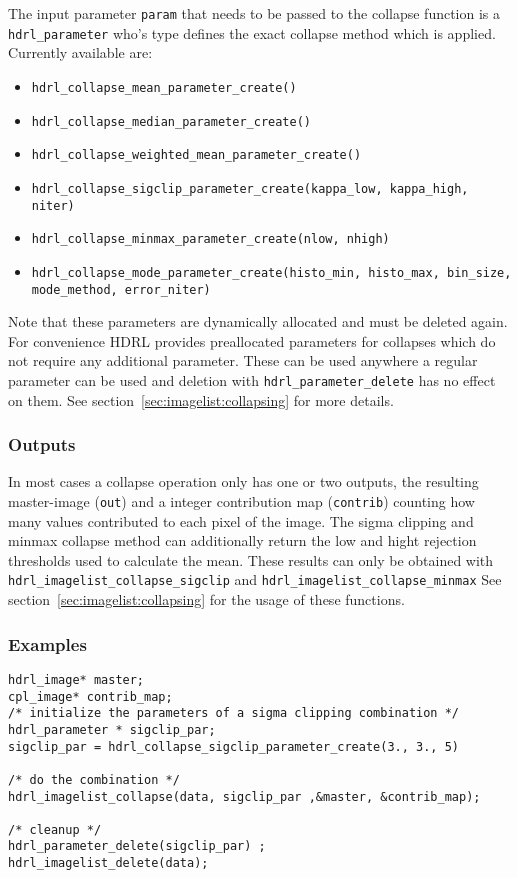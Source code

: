 The input parameter \verb+param+ that needs to be passed to the
collapse function is a \verb+hdrl_parameter+ who's type defines the
exact collapse method which is applied. Currently available are:
\begin{itemize}
\item \verb+hdrl_collapse_mean_parameter_create()+
\item \verb+hdrl_collapse_median_parameter_create()+
\item \verb+hdrl_collapse_weighted_mean_parameter_create()+
\item \verb+hdrl_collapse_sigclip_parameter_create(kappa_low, kappa_high, niter)+
\item \verb+hdrl_collapse_minmax_parameter_create(nlow, nhigh)+
\item \verb+hdrl_collapse_mode_parameter_create(histo_min, histo_max, bin_size,+\\\verb+mode_method, error_niter)+

\end{itemize}

Note that these parameters are dynamically allocated and must be
deleted again.  For convenience HDRL provides preallocated parameters
for collapses which do not require any additional parameter. These
can be used anywhere a regular parameter can be used and deletion with
\verb+hdrl_parameter_delete+ has no effect on them. See
section~\ref{sec:imagelist:collapsing} for more details.

\subsubsection{Outputs}
\label{sec:algorithms:bias:outputs}

In most cases a collapse operation only has one or two outputs, the
resulting master-image (\verb+out+) and a integer contribution map
(\verb+contrib+) counting how many values contributed to each pixel of
the image. The sigma clipping and minmax collapse method can
additionally return the low and hight rejection thresholds used to
calculate the mean.  These results can only be obtained with
\verb+hdrl_imagelist_collapse_sigclip+ and
\verb+hdrl_imagelist_collapse_minmax+ See
section~\ref{sec:imagelist:collapsing} for the usage of these
functions.

\subsubsection{Examples}
\begin{lstlisting}
hdrl_image* master;
cpl_image* contrib_map;
/* initialize the parameters of a sigma clipping combination */
hdrl_parameter * sigclip_par;
sigclip_par = hdrl_collapse_sigclip_parameter_create(3., 3., 5)

/* do the combination */
hdrl_imagelist_collapse(data, sigclip_par ,&master, &contrib_map);

/* cleanup */
hdrl_parameter_delete(sigclip_par) ;
hdrl_imagelist_delete(data);
\end{lstlisting}

